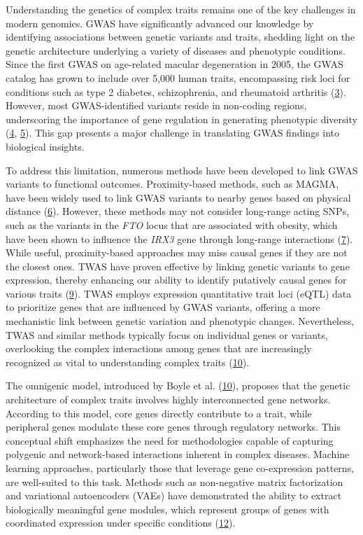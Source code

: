 Understanding the genetics of complex traits remains one of the key challenges in modern genomics.
GWAS have significantly advanced our knowledge by identifying associations between genetic variants and traits, shedding light on the genetic architecture underlying a variety of diseases and phenotypic conditions.
Since the first GWAS on age-related macular degeneration in 2005, the GWAS catalog has grown to include over 5,000 human traits, encompassing risk loci for conditions such as type 2 diabetes, schizophrenia, and rheumatoid arthritis (\protect\hyperlink{ref-HicyXvA4}{3}).
However, most GWAS-identified variants reside in non-coding regions, underscoring the importance of gene regulation in generating phenotypic diversity (\protect\hyperlink{ref-BqjxxhyF}{4}, \protect\hyperlink{ref-9Pr9idng}{5}).
This gap presents a major challenge in translating GWAS findings into biological insights.

To address this limitation, numerous methods have been developed to link GWAS variants to functional outcomes.
Proximity-based methods, such as MAGMA, have been widely used to link GWAS variants to nearby genes based on physical distance (\protect\hyperlink{ref-19XiXgYmd}{6}).
However, these methods may not consider long-range acting SNPs, such as the variants in the \emph{FTO} locus that are associated with obesity, which have been shown to influence the \emph{IRX3} gene through long-range interactions (\protect\hyperlink{ref-167QL5tMV}{7}).
While useful, proximity-based approaches may miss causal genes if they are not the closest ones.
TWAS have proven effective by linking genetic variants to gene expression, thereby enhancing our ability to identify putatively causal genes for various traits (\protect\hyperlink{ref-l6ogswV3}{9}).
TWAS employs expression quantitative trait loci (eQTL) data to prioritize genes that are influenced by GWAS variants, offering a more mechanistic link between genetic variation and phenotypic changes.
Nevertheless, TWAS and similar methods typically focus on individual genes or variants, overlooking the complex interactions among genes that are increasingly recognized as vital to understanding complex traits (\protect\hyperlink{ref-vpIDZCSa}{10}).

The omnigenic model, introduced by Boyle et al. (\protect\hyperlink{ref-vpIDZCSa}{10}), proposes that the genetic architecture of complex traits involves highly interconnected gene networks.
According to this model, core genes directly contribute to a trait, while peripheral genes modulate these core genes through regulatory networks.
This conceptual shift emphasizes the need for methodologies capable of capturing polygenic and network-based interactions inherent in complex diseases.
Machine learning approaches, particularly those that leverage gene co-expression patterns, are well-suited to this task.
Methods such as non-negative matrix factorization and variational autoencoders (VAEs) have demonstrated the ability to extract biologically meaningful gene modules, which represent groups of genes with coordinated expression under specific conditions (\protect\hyperlink{ref-170T6ip47}{12}).

